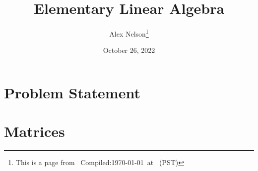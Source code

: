 \documentclass{article}
\title{Elementary Linear Algebra}
\author{Alex Nelson\thanks{This is a page from \homeurl{}\hfil\break\indent\;\, Compiled:\enspace\today\ at \currenttime\ (PST)}}
\date{October 26, 2022}
\begin{document}
\maketitle
\tableofcontents

\part{Problem Statement}

\part{Matrices}




\appendix


\end{document}
